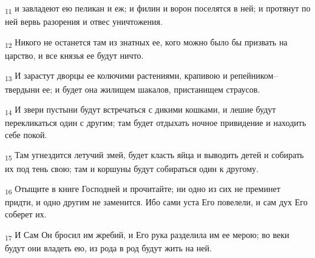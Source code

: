 \begin{tcolorbox}
\textsubscript{11} и завладеют ею пеликан и еж; и филин и ворон поселятся в ней; и протянут по ней вервь разорения и отвес уничтожения.
\end{tcolorbox}
\begin{tcolorbox}
\textsubscript{12} Никого не останется там из знатных ее, кого можно было бы призвать на царство, и все князья ее будут ничто.
\end{tcolorbox}
\begin{tcolorbox}
\textsubscript{13} И зарастут дворцы ее колючими растениями, крапивою и репейником--твердыни ее; и будет она жилищем шакалов, пристанищем страусов.
\end{tcolorbox}
\begin{tcolorbox}
\textsubscript{14} И звери пустыни будут встречаться с дикими кошками, и лешие будут перекликаться один с другим; там будет отдыхать ночное привидение и находить себе покой.
\end{tcolorbox}
\begin{tcolorbox}
\textsubscript{15} Там угнездится летучий змей, будет класть яйца и выводить детей и собирать их под тень свою; там и коршуны будут собираться один к другому.
\end{tcolorbox}
\begin{tcolorbox}
\textsubscript{16} Отыщите в книге Господней и прочитайте; ни одно из сих не преминет придти, и одно другим не заменится. Ибо сами уста Его повелели, и сам дух Его соберет их.
\end{tcolorbox}
\begin{tcolorbox}
\textsubscript{17} И Сам Он бросил им жребий, и Его рука разделила им ее мерою; во веки будут они владеть ею, из рода в род будут жить на ней.
\end{tcolorbox}
